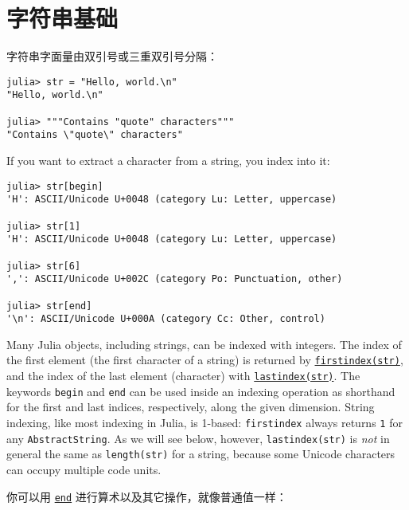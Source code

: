 \hypertarget{6723865345393966445}{}


\section{字符串基础}



字符串字面量由双引号或三重双引号分隔：




\begin{verbatim}
julia> str = "Hello, world.\n"
"Hello, world.\n"

julia> """Contains "quote" characters"""
"Contains \"quote\" characters"
\end{verbatim}



If you want to extract a character from a string, you index into it:




\begin{verbatim}
julia> str[begin]
'H': ASCII/Unicode U+0048 (category Lu: Letter, uppercase)

julia> str[1]
'H': ASCII/Unicode U+0048 (category Lu: Letter, uppercase)

julia> str[6]
',': ASCII/Unicode U+002C (category Po: Punctuation, other)

julia> str[end]
'\n': ASCII/Unicode U+000A (category Cc: Other, control)
\end{verbatim}



Many Julia objects, including strings, can be indexed with integers. The index of the first element (the first character of a string) is returned by \hyperlink{16943669671291374223}{\texttt{firstindex(str)}}, and the index of the last element (character) with \hyperlink{15780929618270241785}{\texttt{lastindex(str)}}. The keywords \texttt{begin} and \texttt{end} can be used inside an indexing operation as shorthand for the first and last indices, respectively, along the given dimension. String indexing, like most indexing in Julia, is 1-based: \texttt{firstindex} always returns \texttt{1} for any \texttt{AbstractString}. As we will see below, however, \texttt{lastindex(str)} is \emph{not} in general the same as \texttt{length(str)} for a string, because some Unicode characters can occupy multiple {\textquotedbl}code units{\textquotedbl}.



你可以用 \hyperlink{11574363005673055470}{\texttt{end}} 进行算术以及其它操作，就像普通值一样：




